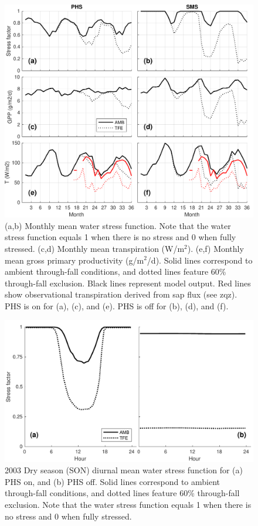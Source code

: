 \documentclass[draft,linenumbers]{agujournal}
\begin{document}
  \clearpage   
  \begin{figure}[h]
     \centering
     \includegraphics[width=30pc]{../figs2/fig3.pdf}
     \caption{(a,b) Monthly mean water stress function. Note that the water stress function equals 1 when there is no stress and 0 when fully stressed.
     (c,d) Monthly mean transpiration (W/m$^2$).
     (e,f) Monthly mean gross primary productivity (g/m$^2$/d). 
     Solid lines correspond to ambient through-fall conditions, and dotted lines feature 60\% through-fall exclusion.
     Black lines represent model output.
     Red lines show observational transpiration derived from sap flux (see zqz).
     PHS is on for (a), (c), and (e). PHS is off for (b), (d), and (f).
     }
     \label{fig:mm}
  \end{figure}
  
    \clearpage
    \begin{figure}[h]
     \centering
     \includegraphics[width=30pc]{../figs2/fig4.pdf}
     \caption{2003 Dry season (SON) diurnal mean water stress function for 
     (a) PHS on, and
     (b) PHS off.
     Solid lines correspond to ambient through-fall conditions, and dotted lines feature 60\% through-fall exclusion.
     Note that the water stress function equals 1 when there is no stress and 0 when fully stressed.
     }
     \label{fig4}
  \end{figure}
  
\end{document}
